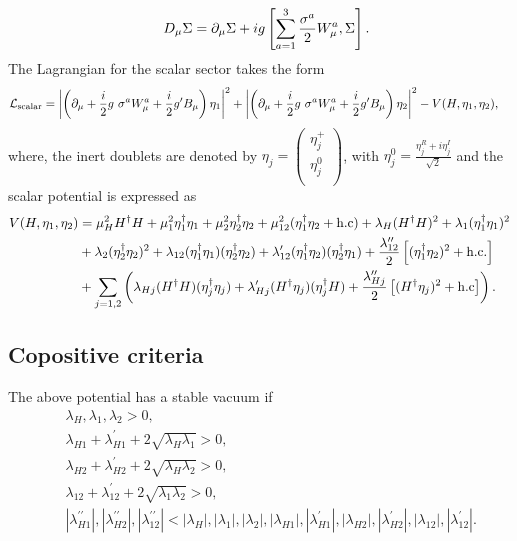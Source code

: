 \documentclass[aps, a4paper,superscriptaddress,12pt,preprintnumbers,floatfix,nofootinbib,amsmath,amssymb]{revtex4}
\newcommand{\nn}{\nonumber}
\begin{document}
\begin{eqnarray}
&& D_\mu \Sigma= \partial_\mu \Sigma + ig \left[\sum_{a=1}^3 \frac{\sigma^a}{2}W^a_\mu, \Sigma\right].
\end{eqnarray}
 The  Lagrangian for the scalar sector takes the form 
 \begin{align}
\mathcal{L}_{\rm scalar} &= \left|\left(\partial_\mu  + \frac{i}{2} g~  \sigma^a W^a_\mu  + \frac{i}{2}g^\prime B_\mu\right) \eta_1\right|^2 +\left|\left(\partial_\mu  + \frac{i}{2} g~  \sigma^a W^a_\mu  + \frac{i}{2}g^\prime B_\mu\right) \eta_2\right|^2 - V(H,\eta_1, \eta_2),
\end{align}
where, the inert doublets are denoted by $\eta_j = \begin{pmatrix}
		 \eta_j^+		\\
		 \eta_j^0	\\
	\end{pmatrix}$, with $\eta_j^0 = \displaystyle{\frac{\eta^R_j+i\eta^I_j}{\sqrt{2}}}$ and the scalar potential is expressed as \cite{Keus:2014jha,Keus:2014isa}
\begin{align}
V(H, \eta_1, \eta_2) &=  \mu^2_H  H^\dagger H +  \mu^2_1 \eta_1^\dagger \eta_1 + \mu^2_2 \eta_2^\dagger \eta_2 +\mu^2_{12} (\eta_1^\dagger \eta_2 + {\rm h.c}) + \lambda_H (H^\dagger H)^2 + \lambda_1 (\eta_1^\dagger \eta_1)^2 \nn\\   
      &+ \lambda_2 (\eta_2^\dagger \eta_2)^2+ \lambda_{12} (\eta_1^\dagger \eta_1) (\eta_2^\dagger \eta_2) + \lambda^\prime_{12} (\eta_1^\dagger \eta_2) (\eta_2^\dagger \eta_1) + \frac{\lambda^{\prime\prime}_{12}}{2} \left[(\eta_1^\dagger \eta_2)^2 + {\rm h.c.}\right] 
       \nonumber\\ &+ \sum_{j=1,2} \left(\lambda_{Hj} (H^\dagger H)(\eta_j^\dagger \eta_j)  
    +  \lambda^\prime_{Hj} (H^\dagger \eta_j)(\eta_j^\dagger H) + \frac{\lambda^{\prime\prime}_{Hj}}{2} \left[(H^\dagger \eta_j)^2 + {\rm h.c}\right]\right).    
\label{scalarpot}
\end{align} 
\newline
\subsection{Copositive criteria}
The above potential has a stable vacuum if \cite{Keus:2014jha}
\begin{eqnarray}
    && \lambda_H,\lambda_1, \lambda_2 > 0,\nn\\
    && \lambda_{H1} + \lambda^\prime_{H1} + 2\sqrt{\lambda_H \lambda_1} > 0,\nn\\
    && \lambda_{H2} + \lambda^\prime_{H2} + 2\sqrt{\lambda_H \lambda_2} > 0,\nn\\
    && \lambda_{12} + \lambda^\prime_{12} + 2\sqrt{\lambda_1 \lambda_2} > 0,\nn\\
    && |\lambda^{\prime\prime}_{H1}|, |\lambda^{\prime\prime}_{H2}|, |\lambda^{\prime\prime}_{12}| < |\lambda_{H}|, |\lambda_{1}| , |\lambda_{2}|, |\lambda_{H1}|,|\lambda^\prime_{H1}|, |\lambda_{H2}|, |\lambda^\prime_{H2}|, |\lambda_{12}|,|\lambda^\prime_{12}|.
\end{eqnarray}
\end{document}
